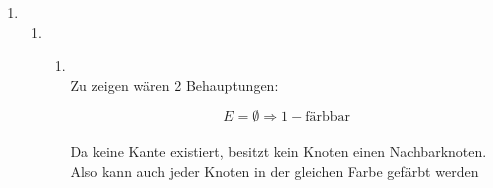 \documentclass[a4paper,11pt,ngerman]{scrartcl}
\begin{document}
\begin{enumerate}
\begin{enumerate}
		\end{enumerate}
		\item[\textbf{2.}]
		\begin{enumerate}
			\item[a)]
			\begin{enumerate}
				\item[(i)]\quad \\
					Zu zeigen wären 2 Behauptungen:
					\begin{multicols}{2}
						\[E = \emptyset \Rightarrow 1-\text{färbbar}\] \\
						Da keine Kante existiert, besitzt kein Knoten einen Nachbarknoten.
						Also kann auch jeder Knoten in der gleichen Farbe gefärbt werden \\ \\


\end{multicols}
\end{enumerate}
\end{enumerate}
\end{enumerate}
\end{document}
